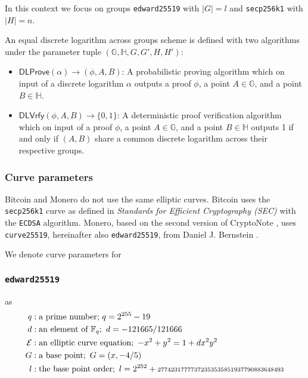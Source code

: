 \documentclass{llncs}
\newcommand{\DLProve}{\textsf{DLProve}}
\newcommand{\DLVrfy}{\textsf{DLVrfy}}
\newcommand{\GG}{\mathbb{G}}
\newcommand{\HH}{\mathbb{H}}
\begin{document}
In this context we focus on groups \texttt{edward25519} with $|G| = l$ and \texttt{secp256k1} with $|H| = n$.

\begin{definition}
    An equal discrete logarithm across groups scheme is defined with two algorithms under the parameter tuple $(\GG,\HH,G,G',H,H')$:
\begin{itemize}
    \item $\DLProve(\alpha) \rightarrow (\phi,A,B)$: A probabilistic proving algorithm which on input of a discrete logarithm $\alpha$ outputs a proof $\phi$, a point $A \in \GG$, and a point $B \in \HH$.
    \item $\DLVrfy(\phi,A,B) \rightarrow \{0,1\}$: A deterministic proof verification algorithm which on input of a proof $\phi$, a point $A \in \GG$, and a point $B \in \HH$ outputs 1 if and only if $(A,B)$ share a common discrete logarithm across their respective groups.
\end{itemize}
\end{definition}

\subsubsection{Curve parameters}
\label{curveParams}
Bitcoin and Monero do not use the same elliptic curves. Bitcoin uses the \texttt{secp256k1} curve as defined in \textit{Standards for Efficient Cryptography (SEC)} with the \texttt{ECDSA} algorithm. Monero, based on the second version of CryptoNote \cite{van2013cryptonote}, uses \texttt{curve25519}, hereinafter also \texttt{edward25519}, from Daniel J. Bernstein \cite{CerRes10}.

We denote curve parameters for

\subsubsection{\texttt{edward25519}} as
\begin{equation}
\begin{split}
    q&: \text{a prime number;}\ q = 2^{255} - 19 \\
    d&: \text{an element of } \mathbb{F}_q;\ d = - 121665/121666 \\
    \mathcal{E}&: \text{an elliptic curve equation};\ -x^2 + y^2 = 1 + dx^2y^2 \\
    G&: \text{a base point};\ G = (x, -4/5) \\
    l&: \text{the base point order};\ l = 2^{252} + \text{\scriptsize27742317777372353535851937790883648493} \\
\end{split}
\end{equation}
\end{document}

